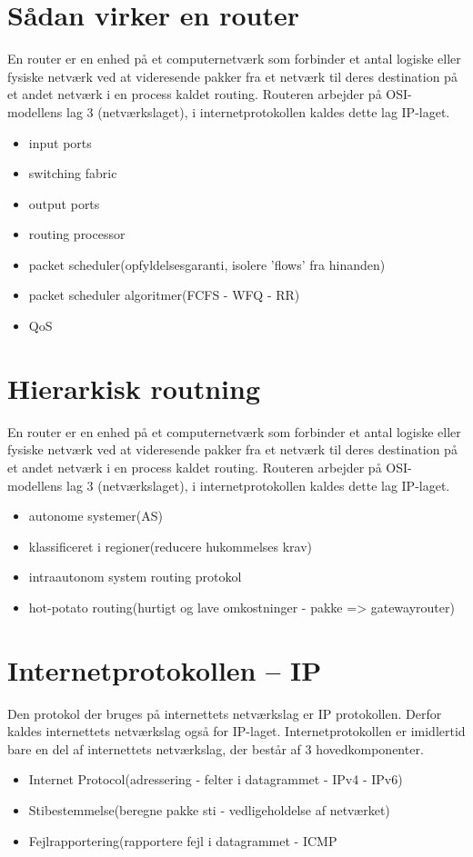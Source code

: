 \section{Sådan virker en router}
En router er en enhed på et computernetværk som forbinder et antal logiske eller fysiske netværk ved at videresende pakker fra et netværk til deres destination på et andet netværk i en process kaldet routing. Routeren arbejder på OSI-modellens lag 3 (netværkslaget), i internetprotokollen kaldes dette lag IP-laget.
\begin{itemize}
	\item input ports
	\item switching fabric
	\item output ports
	\item routing processor
	\item packet scheduler(opfyldelsesgaranti, isolere 'flows' fra hinanden)
	\item packet scheduler algoritmer(FCFS - WFQ - RR)
	\item QoS
\end{itemize}

\section{Hierarkisk routning}
En router er en enhed på et computernetværk som forbinder et antal logiske eller fysiske netværk ved at videresende pakker fra et netværk til deres destination på et andet netværk i en process kaldet routing. Routeren arbejder på OSI-modellens lag 3 (netværkslaget), i internetprotokollen kaldes dette lag IP-laget.
\begin{itemize}
	\item autonome systemer(AS)
	\item klassificeret i regioner(reducere hukommelses krav)
	\item intraautonom system routing protokol
	\item hot-potato routing(hurtigt og lave omkostninger - pakke => gatewayrouter)
\end{itemize}

\section{Internetprotokollen – IP}
Den protokol der bruges på internettets netværkslag er IP protokollen. 
Derfor kaldes internettets netværkslag også for IP-laget. Internetprotokollen er imidlertid bare en del af internettets netværkslag, der består af 3 hovedkomponenter.
\begin{itemize}
	\item Internet Protocol(adressering - felter i datagrammet - IPv4 - IPv6)
	\item Stibestemmelse(beregne pakke sti - vedligeholdelse af netværket)
	\item Fejlrapportering(rapportere  fejl i datagrammet - ICMP
\end{itemize}

